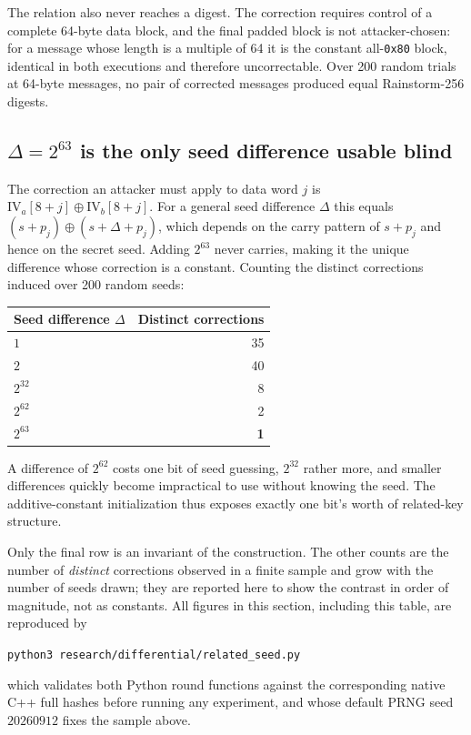 \documentclass[11pt,a4paper]{article}
\begin{document}
The relation also never reaches a digest. The correction requires control of a
complete 64-byte data block, and the final padded block is not attacker-chosen:
for a message whose length is a multiple of 64 it is the constant all-\texttt{0x80}
block, identical in both executions and therefore uncorrectable. Over 200 random
trials at 64-byte messages, no pair of corrected messages produced equal
Rainstorm-256 digests.

\subsection*{\(\Delta = 2^{63}\) is the only seed difference usable blind}

The correction an attacker must apply to data word \( j \) is
\( \mathrm{IV}_a[8+j] \oplus \mathrm{IV}_b[8+j] \). For a general seed difference
\( \Delta \) this equals
\( (s + p_j) \oplus (s + \Delta + p_j) \), which depends on the carry pattern of
\( s + p_j \) and hence on the secret seed. Adding \( 2^{63} \) never carries,
making it the unique difference whose correction is a constant. Counting the
distinct corrections induced over 200 random seeds:

\begin{center}
\begin{tabular}{lr}
\toprule
Seed difference \( \Delta \) & Distinct corrections \\
\midrule
\( 1 \)      & 35 \\
\( 2 \)      & 40 \\
\( 2^{32} \) & 8 \\
\( 2^{62} \) & 2 \\
\( 2^{63} \) & \textbf{1} \\
\bottomrule
\end{tabular}
\end{center}

A difference of \( 2^{62} \) costs one bit of seed guessing, \( 2^{32} \) rather
more, and smaller differences quickly become impractical to use without knowing
the seed. The additive-constant initialization thus exposes exactly one bit's
worth of related-key structure.

Only the final row is an invariant of the construction. The other counts are
the number of \emph{distinct} corrections observed in a finite sample and grow
with the number of seeds drawn; they are reported here to show the contrast in
order of magnitude, not as constants. All figures in this section, including
this table, are reproduced by
\begin{center}
\texttt{python3 research/differential/related\_seed.py}
\end{center}
which validates both Python round functions against the corresponding native
C++ full hashes before running any experiment, and whose default PRNG seed
\( 20260912 \) fixes the sample above.
\end{document}

